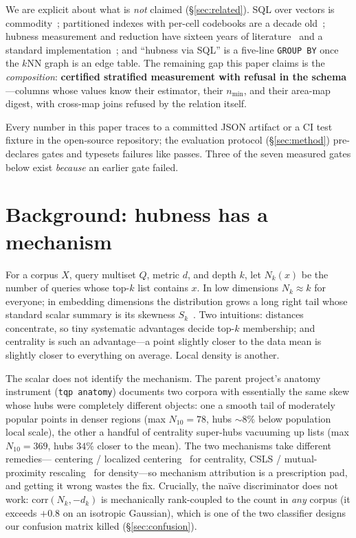 \documentclass[sigconf, nonacm]{acmart}
\begin{document}
We are explicit about what is \emph{not} claimed
(\S\ref{sec:related}). SQL over vectors is
commodity~\cite{pgvector2023,raasveldt2019duckdb}; partitioned indexes
with per-cell codebooks are a decade
old~\cite{jegou2011product,kalantidis2014lopq,chen2021spann}; hubness
measurement and reduction have sixteen years of
literature~\cite{radovanovic2010hubs,schnitzer2012mutual,hara2015localized,conneau2018word}
and a standard implementation~\cite{feldbauer2020scikithubness}; and
``hubness via SQL'' is a five-line \texttt{GROUP BY} once the $k$NN graph
is an edge table. The remaining gap this paper claims is the
\emph{composition}: \textbf{certified stratified measurement with refusal
in the schema}---columns whose values know their estimator, their
$n_{\min}$, and their area-map digest, with cross-map joins refused by the
relation itself.

Every number in this paper traces to a committed JSON artifact or a CI
test fixture in the open-source repository; the evaluation protocol
(\S\ref{sec:method}) pre-declares gates and typesets failures like passes.
Three of the seven measured gates below exist \emph{because} an earlier
gate failed.

\section{Background: hubness has a mechanism}
\label{sec:background}

For a corpus $X$, query multiset $Q$, metric $d$, and depth $k$, let
$N_k(x)$ be the number of queries whose top-$k$ list contains $x$. In low
dimensions $N_k \approx k$ for everyone; in embedding dimensions the
distribution grows a long right tail whose standard scalar summary is its
skewness $S_k$~\cite{radovanovic2010hubs}. Two intuitions: distances
concentrate, so tiny systematic advantages decide top-$k$ membership; and
centrality is such an advantage---a point slightly closer to the data mean
is slightly closer to everything on average. Local density is another.

The scalar does not identify the mechanism. The parent project's anatomy
instrument (\texttt{tqp anatomy}) documents two corpora with essentially
the same skew whose hubs were completely different objects: one a smooth
tail of moderately popular points in denser regions (max $N_{10}=78$,
hubs ${\sim}8\%$ below population local scale), the other a handful of
centrality super-hubs vacuuming up lists (max $N_{10}=369$, hubs $34\%$
closer to the mean). The two mechanisms take different remedies---%
centering / localized centering~\cite{hara2015localized} for centrality,
CSLS / mutual-proximity rescaling~\cite{conneau2018word,schnitzer2012mutual}
for density---so mechanism attribution is a prescription pad, and getting
it wrong wastes the fix. Crucially, the na\"ive discriminator does not
work: $\mathrm{corr}(N_k, -d_k)$ is mechanically rank-coupled to the count
in \emph{any} corpus (it exceeds $+0.8$ on an isotropic Gaussian), which
is one of the two classifier designs our confusion matrix killed
(\S\ref{sec:confusion}).
\end{document}
